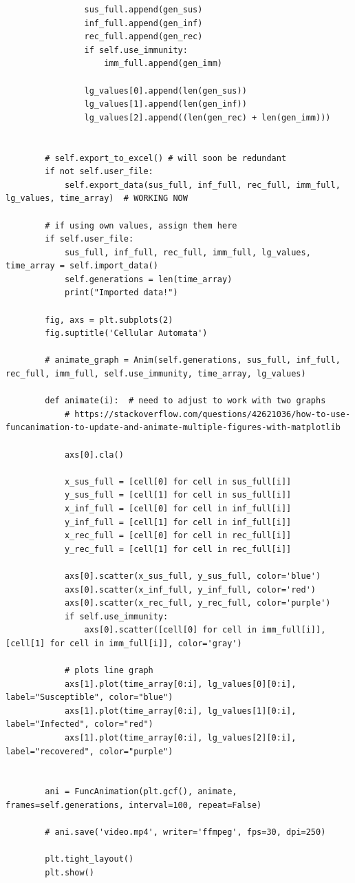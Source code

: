 \documentclass[11pt, a4paper]{article}
\begin{document}
\begin{lstlisting}
                sus_full.append(gen_sus)
                inf_full.append(gen_inf)
                rec_full.append(gen_rec)
                if self.use_immunity:
                    imm_full.append(gen_imm)

                lg_values[0].append(len(gen_sus))
                lg_values[1].append(len(gen_inf))
                lg_values[2].append((len(gen_rec) + len(gen_imm)))


        # self.export_to_excel() # will soon be redundant
        if not self.user_file:
            self.export_data(sus_full, inf_full, rec_full, imm_full, lg_values, time_array)  # WORKING NOW

        # if using own values, assign them here
        if self.user_file:
            sus_full, inf_full, rec_full, imm_full, lg_values, time_array = self.import_data()
            self.generations = len(time_array)
            print("Imported data!")

        fig, axs = plt.subplots(2)
        fig.suptitle('Cellular Automata')

        # animate_graph = Anim(self.generations, sus_full, inf_full, rec_full, imm_full, self.use_immunity, time_array, lg_values)

        def animate(i):  # need to adjust to work with two graphs
            # https://stackoverflow.com/questions/42621036/how-to-use-funcanimation-to-update-and-animate-multiple-figures-with-matplotlib

            axs[0].cla()

            x_sus_full = [cell[0] for cell in sus_full[i]]
            y_sus_full = [cell[1] for cell in sus_full[i]]
            x_inf_full = [cell[0] for cell in inf_full[i]]
            y_inf_full = [cell[1] for cell in inf_full[i]]
            x_rec_full = [cell[0] for cell in rec_full[i]]
            y_rec_full = [cell[1] for cell in rec_full[i]]

            axs[0].scatter(x_sus_full, y_sus_full, color='blue')
            axs[0].scatter(x_inf_full, y_inf_full, color='red')
            axs[0].scatter(x_rec_full, y_rec_full, color='purple')
            if self.use_immunity:
                axs[0].scatter([cell[0] for cell in imm_full[i]], [cell[1] for cell in imm_full[i]], color='gray')

            # plots line graph
            axs[1].plot(time_array[0:i], lg_values[0][0:i], label="Susceptible", color="blue")
            axs[1].plot(time_array[0:i], lg_values[1][0:i], label="Infected", color="red")
            axs[1].plot(time_array[0:i], lg_values[2][0:i], label="recovered", color="purple")


        ani = FuncAnimation(plt.gcf(), animate, frames=self.generations, interval=100, repeat=False)

        # ani.save('video.mp4', writer='ffmpeg', fps=30, dpi=250)

        plt.tight_layout()
        plt.show()

\end{lstlisting}
\end{document}
